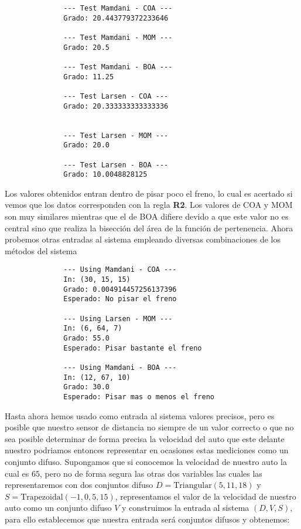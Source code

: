 \documentclass[a4paper,10pt,twocolumn]{article}
\begin{document}
\begin{verbatim}
	          --- Test Mamdani - COA --- 
	          Grado: 20.443779372233646
	
	          --- Test Mamdani - MOM --- 
	          Grado: 20.5
	
	          --- Test Mamdani - BOA --- 
	          Grado: 11.25
	
	          --- Test Larsen - COA --- 
	          Grado: 20.333333333333336
	
	
	          --- Test Larsen - MOM --- 
	          Grado: 20.0
	
	          --- Test Larsen - BOA --- 
	          Grado: 10.0048828125
\end{verbatim}

Los valores obtenidos entran dentro de pisar poco el freno, lo cual es acertado si vemos que los datos corresponden con la regla \textbf{R2}. Los valores de COA y MOM son muy similares mientras que el de BOA difiere devido a que este valor no es central sino que realiza la bisecci\'on del \'area de la funci\'on de pertenencia. Ahora probemos otras entradas al sistema empleando diversas combinaciones de los m\'etodos del sistema

\begin{verbatim}
	          --- Using Mamdani - COA --- 
	          In: (30, 15, 15) 
	          Grado: 0.004914457256137396
	          Esperado: No pisar el freno
	
	          --- Using Larsen - MOM --- 
	          In: (6, 64, 7)
	          Grado: 55.0
	          Esperado: Pisar bastante el freno
	
	          --- Using Mamdani - BOA --- 
	          In: (12, 67, 10)
	          Grado: 30.0
	          Esperado: Pisar mas o menos el freno
\end{verbatim}

Hasta ahora hemos usado como entrada al sistema valores precisos, pero es posible que nuestro sensor de distancia no siempre de un valor correcto o que no sea posible determinar de forma precisa la velocidad del auto que este delante nuestro podriamos entonces representar en ocasiones estas mediciones como un conjunto difuso. Supongamos que si conocemos la velocidad de nuestro auto la cual es $65$, pero no de forma segura las otras dos variables las cuales las representaremos con dos conjuntos difuso $D = \text{Triangular} (5, 11, 18)$ y $S = \text{Trapezoidal} (-1, 0, 5, 15)$, representamos el valor de la velocidad de nuestro auto como un conjunto difuso $V$ y construimos la entrada al sistema $(D, V, S)$, para ello establecemos que nuestra entrada ser\'a conjuntos difusos y obtenemos:
\end{document}
